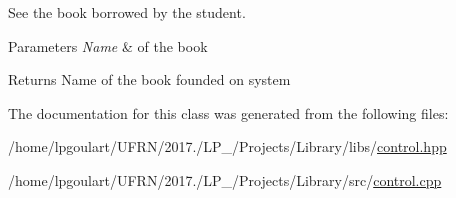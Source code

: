 See the book borrowed by the student. 


\begin{DoxyParams}{Parameters}
{\em Name} & of the book \\
\hline
\end{DoxyParams}
\begin{DoxyReturn}{Returns}
Name of the book founded on system 
\end{DoxyReturn}


The documentation for this class was generated from the following files\+:\begin{DoxyCompactItemize}
\item 
/home/lpgoulart/\+U\+F\+R\+N/2017./\+L\+P\+\_/\+Projects/\+Library/libs/\hyperlink{control_8hpp}{control.\+hpp}\item 
/home/lpgoulart/\+U\+F\+R\+N/2017./\+L\+P\+\_/\+Projects/\+Library/src/\hyperlink{control_8cpp}{control.\+cpp}\end{DoxyCompactItemize}
